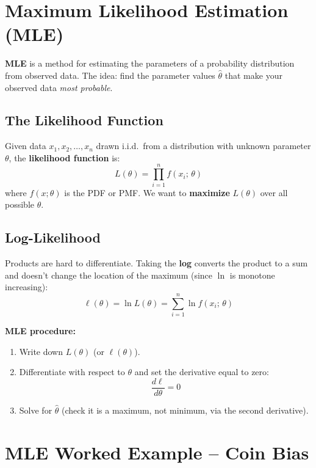 \documentclass[11pt, letterpaper]{article}
\begin{document}
\vspace{8pt}

\section*{Maximum Likelihood Estimation (MLE)}

\textbf{MLE} is a method for estimating the parameters of a probability distribution from observed data. The idea: find the parameter values $\hat{\theta}$ that make your observed data \emph{most probable}.

\subsection*{The Likelihood Function}

Given data $x_1, x_2, \ldots, x_n$ drawn i.i.d.\ from a distribution with unknown parameter $\theta$, the \textbf{likelihood function} is:
\[
  L(\theta) = \prod_{i=1}^{n} f(x_i;\, \theta)
\]
where $f(x;\theta)$ is the PDF or PMF. We want to \textbf{maximize} $L(\theta)$ over all possible $\theta$.

\subsection*{Log-Likelihood}

Products are hard to differentiate. Taking the \textbf{log} converts the product to a sum and doesn't change the location of the maximum (since $\ln$ is monotone increasing):
\[
  \ell(\theta) = \ln L(\theta) = \sum_{i=1}^{n} \ln f(x_i;\,\theta)
\]

\textbf{MLE procedure:}
\begin{enumerate}[noitemsep]
  \item Write down $L(\theta)$ (or $\ell(\theta)$).
  \item Differentiate with respect to $\theta$ and set the derivative equal to zero:
  \[
    \frac{d\ell}{d\theta} = 0
  \]
  \item Solve for $\hat{\theta}$ (check it is a maximum, not minimum, via the second derivative).
\end{enumerate}

\section*{MLE Worked Example -- Coin Bias}
\end{document}
